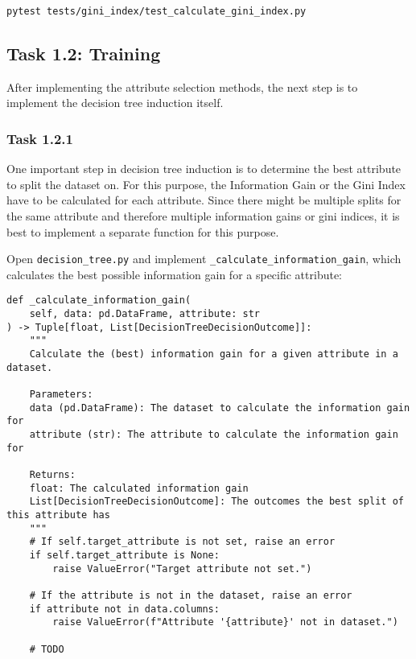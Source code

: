 \documentclass[
english,
smallborders
]{i6prcsht}
\begin{document}
\begin{lstlisting}
pytest tests/gini_index/test_calculate_gini_index.py
\end{lstlisting}

\vspace*{0.1cm}

\subsection*{Task 1.2: Training}

After implementing the attribute selection methods, the next step is to implement the decision tree induction itself.

\subsubsection*{Task 1.2.1}

One important step in decision tree induction is to determine the best attribute to split the dataset on. For this purpose, the Information Gain or the Gini Index have to be calculated for each attribute. Since there might be multiple splits for the same attribute and therefore multiple information gains or gini indices, it is best to implement a separate function for this purpose.

Open \texttt{decision\_tree.py} and implement \texttt{\_calculate\_information\_gain}, which calculates the best possible information gain for a specific attribute:

\vspace*{0.3cm}

\begin{lstlisting}
def _calculate_information_gain(
	self, data: pd.DataFrame, attribute: str
) -> Tuple[float, List[DecisionTreeDecisionOutcome]]:
	"""
	Calculate the (best) information gain for a given attribute in a dataset.

	Parameters:
	data (pd.DataFrame): The dataset to calculate the information gain for
	attribute (str): The attribute to calculate the information gain for

	Returns:
	float: The calculated information gain
	List[DecisionTreeDecisionOutcome]: The outcomes the best split of this attribute has
	"""
	# If self.target_attribute is not set, raise an error
	if self.target_attribute is None:
		raise ValueError("Target attribute not set.")

	# If the attribute is not in the dataset, raise an error
	if attribute not in data.columns:
		raise ValueError(f"Attribute '{attribute}' not in dataset.")

	# TODO
\end{lstlisting}
\end{document}
